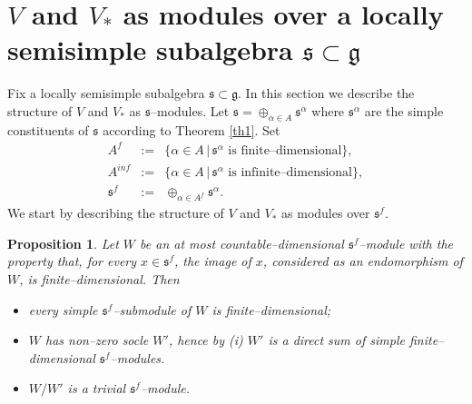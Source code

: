 \documentclass[oneside,leqno,12pt]{article}
\newcounter{theorem}
\newtheorem{prop}[theo]{Proposition}
\def\gg{\mathfrak{g}}
\def\gs{\mathfrak{s}}
\renewcommand{\ss}{\mathfrak{s}}
\renewcommand{\gg}{\mathfrak{g}}
\newcommand{\refth}[1]{Theorem \ref{#1}}
\begin{document}
\section{$V$ and $V_*$ as modules over a locally semisimple subalgebra $\ss \subset \gg$ }
Fix    a locally semisimple subalgebra $\gs \subset \gg$. In this section we describe the structure of $V$ and $V_*$
as  $\ss$--modules. Let $\ss=\oplus_{\alpha\in A}\ss^\alpha$ where  $\ss^\alpha$ 
are the simple constituents of $\ss$ according to \refth{th1}. Set
\begin{equation*}
\begin{array}{lcl}
A^f&:=&\{\alpha\in A\,|\, \ss^\alpha {\text { is finite--dimensional}}\},\\
A^{inf}&:=&\{\alpha\in A\,|\, \ss^\alpha {\text { is infinite--dimensional}}\},\\
\ss^f&:=&\oplus_{\alpha\in A^f}\ss^\alpha.
\end{array}
\end{equation*}
We start by describing the structure of $V$ and $V_*$ as modules over $\ss^f$. 
\begin{prop}\label{prop4}
Let $W$ be an at most countable--dimensional $\ss^f$--module with the property that, for every $x\in\ss^f$, 
the image of $x$, considered as an endomorphism of $W$, is finite--dimensional. Then
\begin{itemize}
\item[\rm{(i)}] every simple $\ss^f$--submodule of $W$ is finite--dimensional;
\item[\rm{(ii)}] $W$ has non--zero socle $W'$, hence by {\rm {(i)}} $W'$ is a direct sum of simple finite--dimensional $\ss^f$--modules.
\item[\rm{(iii)}] $W/W'$ is a trivial $\ss^f$--module.
\end{itemize}
\end{prop}
\end{document}
